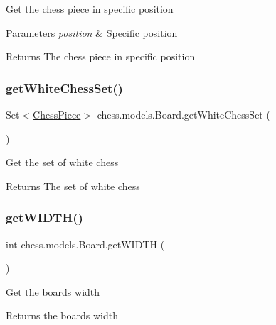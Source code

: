 Get the chess piece in specific position


\begin{DoxyParams}{Parameters}
{\em position} & Specific position \\
\hline
\end{DoxyParams}
\begin{DoxyReturn}{Returns}
The chess piece in specific position 
\end{DoxyReturn}
\mbox{\label{classchess_1_1models_1_1_board_a0fab147b0205caf586306a03e758e7bb}} 
\subsubsection{\texorpdfstring{get\+White\+Chess\+Set()}{getWhiteChessSet()}}
{\footnotesize\ttfamily Set$<$\mbox{\hyperlink{classchess_1_1models_1_1_chess_piece}{Chess\+Piece}}$>$ chess.\+models.\+Board.\+get\+White\+Chess\+Set (\begin{DoxyParamCaption}{ }\end{DoxyParamCaption})}

Get the set of white chess

\begin{DoxyReturn}{Returns}
The set of white chess 
\end{DoxyReturn}
\mbox{\label{classchess_1_1models_1_1_board_aeab935c6befad60e51084a78458ebf39}} 
\subsubsection{\texorpdfstring{get\+W\+I\+D\+T\+H()}{getWIDTH()}}
{\footnotesize\ttfamily int chess.\+models.\+Board.\+get\+W\+I\+D\+TH (\begin{DoxyParamCaption}{ }\end{DoxyParamCaption})}

Get the board\textquotesingle{}s width

\begin{DoxyReturn}{Returns}
the board\textquotesingle{}s width 
\end{DoxyReturn}
\mbox{\label{classchess_1_1models_1_1_board_a59a36d62ed2b4ef22b14fda1c10968d8}} 
